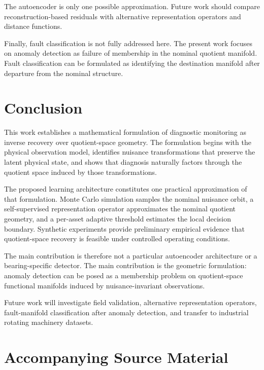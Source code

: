 \documentclass[11pt,letterpaper]{article}
\begin{document}
The autoencoder is only one possible approximation.
Future work should compare reconstruction-based residuals with alternative representation operators and distance functions.

Finally, fault classification is not fully addressed here.
The present work focuses on anomaly detection as failure of membership in the nominal quotient manifold.
Fault classification can be formulated as identifying the destination manifold after departure from the nominal structure.

\section{Conclusion}

This work establishes a mathematical formulation of diagnostic monitoring as inverse recovery over quotient-space geometry.
The formulation begins with the physical observation model, identifies nuisance transformations that preserve the latent physical state, and shows that diagnosis naturally factors through the quotient space induced by those transformations.

The proposed learning architecture constitutes one practical approximation of that formulation.
Monte Carlo simulation samples the nominal nuisance orbit, a self-supervised representation operator approximates the nominal quotient geometry, and a per-asset adaptive threshold estimates the local decision boundary.
Synthetic experiments provide preliminary empirical evidence that quotient-space recovery is feasible under controlled operating conditions.

The main contribution is therefore not a particular autoencoder architecture or a bearing-specific detector.
The main contribution is the geometric formulation:
anomaly detection can be posed as a membership problem on quotient-space functional manifolds induced by nuisance-invariant observations.

Future work will investigate field validation, alternative representation operators, fault-manifold classification after anomaly detection, and transfer to industrial rotating machinery datasets.

\section*{Accompanying Source Material}
\end{document}
